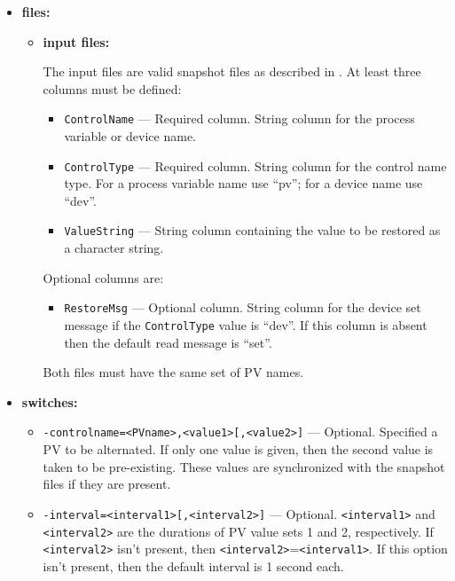 \begin{itemize}
\item {\bf files:}
\begin{itemize}
\item {\bf input files:}\par
The input files are valid snapshot files as described in . At least three
columns must be defined:
\begin{itemize}
        \item {\tt ControlName} --- Required column. String column for the process variable or device name.
        \item {\tt ControlType} --- Required column. String column for the control name type. For a 
                process variable name use ``pv''; for a device name use ``dev''.
        \item {\tt ValueString} --- String column containing the value to be restored as a character string.
\end{itemize}
Optional columns are:
\begin{itemize}
        \item {\tt RestoreMsg} --- Optional column. String column for the device set message if 
                the {\tt ControlType} value is ``dev''.
                If this column is absent then the default read message is ``set''.
\end{itemize}
        Both files must have the same set of PV names.
\end{itemize}
%
\item {\bf switches:}
%
%
    \begin{itemize}
%
%
        \item {\tt -controlname=<PVname>,<value1>[,<value2>]} --- Optional. Specified a PV to be 
                alternated. If only one value is given, then the second value
                is taken to be pre-existing. These values are synchronized with
                the snapshot files if they are present.
        \item {\tt -interval=<interval1>[,<interval2>]} ---  Optional. \verb+<interval1>+ and \verb+<interval2>+
                 are the durations of PV value sets 1 and 2, respectively.
                 If \verb+<interval2>+ isn't present, then \verb+<interval2>+=\verb+<interval1>+.
                 If this option isn't present, then the default interval is 1 second each.

\end{itemize}
\end{itemize}
